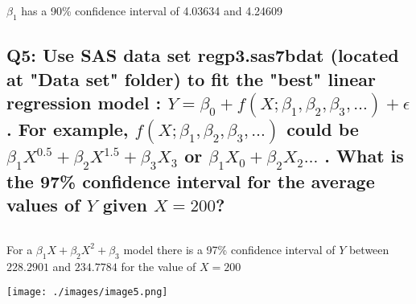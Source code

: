 \documentclass[a4paper,man,natbib]{apa6}
\begin{document}
$\beta_1$ has a 90\% confidence interval of 4.03634 and 4.24609




\subsection*{Q5: Use SAS data set regp3.sas7bdat (located at "Data set" folder) to fit the "best" linear regression model : $Y = \beta_0 + f(X; \beta_1, \beta_2, \beta_3, \ldots) + \epsilon$. For example, $f(X; \beta_1, \beta_2, \beta_3, \ldots)$ could be $\beta_1X^{0.5} + \beta_2 X^{1.5} + \beta_3 X_3$ or $\beta_1X_0 + \beta_2 X_2 \ldots$ . What is the 97\% confidence interval for the average values of $Y$ given $X=200$? }
\inputminted[breaklines,bgcolor=light-gray]{sas}{./Snippets/DAT502-HW6-5.sas}

For a $\beta_1X + \beta_2 X^2 + \beta_3$ model there is a 97\% confidence interval of $Y$ between $228.2901$ and $234.7784$ for the value of $X=200$

\texttt{[image: ./images/image5.png]}

\end{document}
